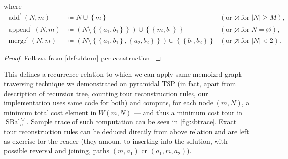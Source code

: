 \documentclass[titlepage,twoside,index=totoc,bibliography=totoc]{scrartcl}
\newcommand{\annotation}[1]{\marginpar{\small\itshape\color{green}#1}}
\numberwithin{equation}{section}
\numberwithin{figure}{section}
\numberwithin{table}{section}
\begin{document}
\begin{proposition}
  where
  \[
  \begin{alignedat}{2}
    \operatorname{add}^\prime\left(N,m\right) & \coloneqq
    N \cup \left\{m\right\}
    & (\text{or}\; \varnothing \;\text{for}\; \left|N\right| \geq M),
    \\
    \operatorname{append}^\prime\left(N,m\right) & \coloneqq
    \left(N \setminus \left\{\left\{a_1,b_1\right\}\right\}\right) \cup \left\{\left\{m,b_1\right\}\right\}
    & (\text{or}\; \varnothing \;\text{for}\; N = \varnothing),
    \\
    \operatorname{merge}^\prime\left(N,m\right) & \coloneqq
    \left(N \setminus \left\{\left\{a_1,b_1\right\},\left\{a_2,b_2\right\}\right\}\right)
      \cup \left\{\left\{b_1,b_2\right\}\right\}
    & (\text{or}\; \varnothing \;\text{for}\; \left|N\right| < 2).
  \end{alignedat}
  \]
\end{proposition}
\begin{proof}
  Follows from \cref{def:sbtour} per construction.
\end{proof}

This defines a recurrence relation to which we can apply same memoized
graph traversing technique we demonstrated on pyramidal TSP (in fact, apart
from description of recursion tree, counting tour reconstruction rules, our
implementation uses same code for both) and compute, for each node
$\left(m,N\right)$, a minimum total cost element in $W\left(m,N\right)$ ---
and thus a minimum cost tour in $\operatorname{SBal}_n^M$.  Sample trace of
such computation can be seen in \cref{fig:sbtrace}.  Exact tour
reconstruction rules can be deduced directly from above relation and are
left as exercise for the reader (they amount to inserting into the
solution, with possible reversal and joining, paths $(m,a_1)$ or
$(a_1,m,a_2)$).

\setlength{\aboverulesep}{0pt}
\setlength{\belowrulesep}{0pt}
\renewcommand{\tabcolsep}{9pt}
\setlength{\extrarowheight}{1.1ex}
\end{document}
